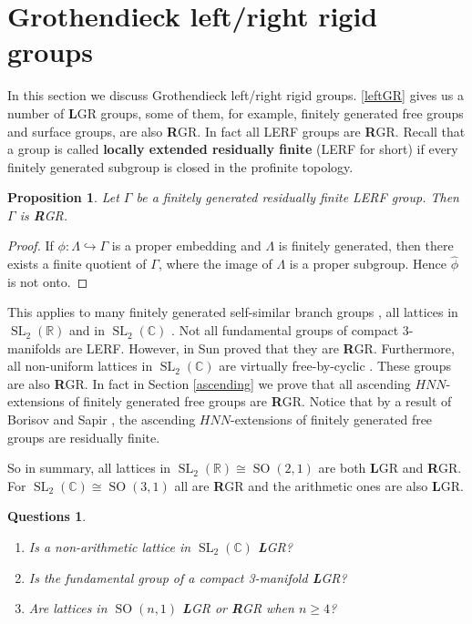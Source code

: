 \documentclass{amsart}
\newtheorem{pro}[lem]{Proposition}
\newtheorem{Questions}[Conj]{Questions}
\theoremstyle{definition}
\theoremstyle{remark}
\DeclareMathOperator{\SL}{SL}\DeclareMathOperator{\GL}{GL}
\DeclareMathOperator{\SO}{SO}
\newcommand{\R}{\mathbb{R}}
\newcommand{\CC}{\mathbb{C}}
\begin{document}
 \section{  Grothendieck left/right  rigid groups}\label{LRGR}
 In this section we discuss Grothendieck left/right rigid groups. \cref{leftGR} gives us a number of {\textbf L}GR groups, some of them, for example, finitely generated free groups and surface groups, are also {\textbf R}GR. In fact all LERF groups  are {\textbf R}GR. Recall that a group is called {\bf locally extended residually finite} (LERF for short) if every finitely generated subgroup is   closed in the profinite topology.  
 \begin{pro}
 Let $\Gamma$ be a finitely generated residually finite LERF group. Then $\Gamma$ is {\textbf R}GR.
 \end{pro}
 \begin{proof}
 If  $\phi:\Lambda\hookrightarrow \Gamma$ is a proper embedding and $\Lambda$  is finitely generated, then there exists a finite quotient of $\Gamma$, where the image of $\Lambda$ is a proper subgroup. Hence $\widehat \phi$ is not onto.
 \end{proof}
 This applies   to many finitely generated self-similar branch groups \cite{GLN21},  all lattices in $\SL_2(\R)$ and  in $\SL_2(\CC)$ \cite{Wi04, AFW15}. Not all  fundamental groups of  compact 3-manifolds are LERF. 
However, in   \cite{Su23} Sun proved that they are {\textbf R}GR. Furthermore, all non-uniform lattices in $\SL_2(\CC)$ are virtually free-by-cyclic  \cite{Wi04, AFW15}. These groups  are also {\textbf R}GR. In fact in Section \ref{ascending} we prove that  all ascending $HNN$-extensions of finitely generated free groups are {\textbf R}GR. 
Notice that by a result of Borisov and Sapir \cite{BS05}, the ascending $HNN$-extensions of finitely generated free groups are residually finite.


So in summary, all lattices in $\SL_2(\R)\cong \SO(2,1)$ are both {\textbf L}GR and {\textbf R}GR. For $\SL_2(\CC)\cong \SO(3,1)$ all are {\textbf R}GR and the arithmetic ones are also  {\textbf L}GR.
 \begin{Questions}\
 \begin{enumerate}
 \item[(a)] Is a non-arithmetic lattice in $\SL_2(\CC)$  {\textbf L}GR?
 \item[(b)]
 Is   the fundamental group of a compact 3-manifold {\textbf L}GR?
 \item[(c)] Are lattices in $\SO(n,1)$ {\textbf L}GR or {\textbf R}GR when $n\ge 4$?

 \end{enumerate}
 \end{Questions}
\end{document}

